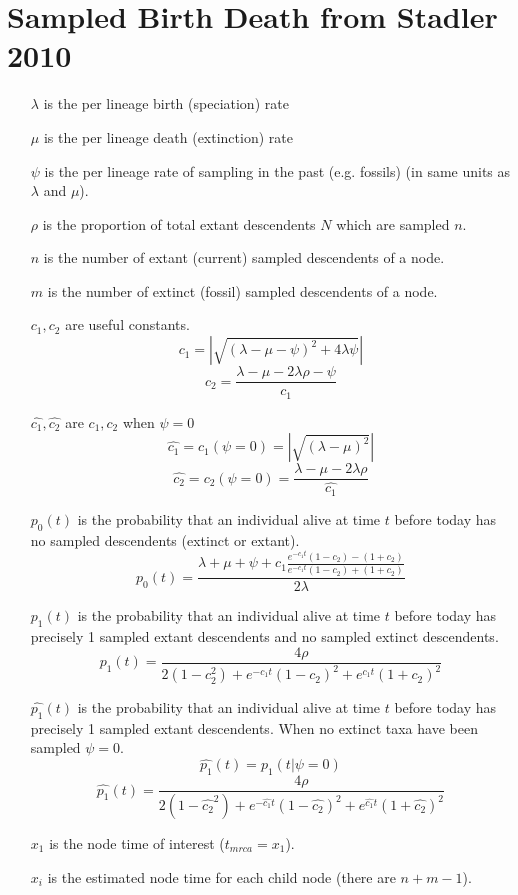 \documentclass{llncs}
\begin{document}
\section{Sampled Birth Death from Stadler 2010 \cite{Stadler2010}}


\begin{enumerate}
\item[$\lambda$]  is the per lineage birth (speciation) rate
\item[$\mu$]  is the per lineage death (extinction) rate
\item[$\psi$]  is the per lineage rate of sampling in the past (e.g. fossils) (in same units as $\lambda$ and $\mu$).
\item[$\rho$ ] is the proportion of total extant descendents $N$ which are sampled $n$.
\item[$n$] is the number of extant (current) sampled descendents of a node.
\item[$m$] is the number of extinct (fossil) sampled descendents of a node.
\item[$c_1,c_2$]  are useful constants.
$$c_1 = |\sqrt{(\lambda-\mu-\psi)^2 + 4\lambda\psi}|$$
$$c_2 = \frac{\lambda-\mu-2\lambda\rho-\psi}{c_1}$$
\item[$\hat{c_1},\hat{c_2}$]  are $c_1,c_2$ when $\psi=0$
$$\hat{c_1}=c_1(\psi=0) = |\sqrt{(\lambda-\mu)^2}|$$
$$\hat{c_2}=c_2(\psi=0) = \frac{\lambda-\mu-2\lambda\rho}{\hat{c_1}}$$
\item[$p_0(t)$]  is the probability that an individual alive at time $t$ before today has no sampled descendents (extinct or extant).
$$p_0(t) = \frac{\lambda+\mu+\psi+c_1\frac{e^{-c_1t}(1-c_2)-(1+c_2)}{e^{-c_1t}(1-c_2)+(1+c_2)}}{2\lambda}$$
\item[$p_1(t)$]  is the probability that an individual alive at time $t$ before today has precisely 1 sampled extant descendents and no sampled extinct descendents.
$${p_1}(t) = \frac{4\rho}{2(1-c_2^2)+e^{-c_1t}(1-c_2)^2+e^{c_1t}(1+c_2)^2}$$
\item[$\hat{p_1}(t)$]  is the probability that an individual alive at time $t$ before today has precisely 1 sampled extant descendents. When no extinct taxa have been sampled $\psi = 0$.
$$\hat{p_1}(t) = p_1(t|\psi=0)$$
$$\hat{p_1}(t) = \frac{4\rho}{2(1-\hat{c_2}^2)+e^{-\hat{c_1}t}(1-\hat{c_2})^2+e^{\hat{c_1}t}(1+\hat{c_2})^2}$$
\item[$x_1$]  is the node time of interest ($t_{mrca}=x_1$).
\item[$x_i$]  is the estimated node time for each child node (there are $n+m-1$).

\end{enumerate}
\end{document}
